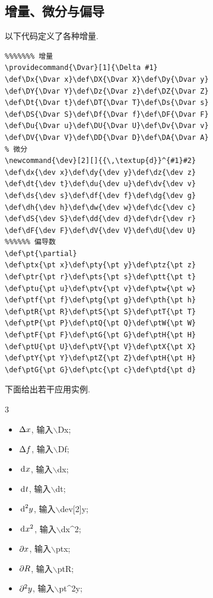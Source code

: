 \documentclass[a4paper,12pt,twoside]{ctexart}
\begin{document}
\subsection{增量、微分与偏导}
以下代码定义了各种增量.\vspace*{-10pt}
\begin{verbatim}
%%%%%%% 增量
\providecommand{\Dvar}[1]{\Delta #1}
\def\Dx{\Dvar x}\def\DX{\Dvar X}\def\Dy{\Dvar y}
\def\DY{\Dvar Y}\def\Dz{\Dvar z}\def\DZ{\Dvar Z}
\def\Dt{\Dvar t}\def\DT{\Dvar T}\def\Ds{\Dvar s}
\def\DS{\Dvar S}\def\Df{\Dvar f}\def\DF{\Dvar F}
\def\Du{\Dvar u}\def\DU{\Dvar U}\def\Dv{\Dvar v}
\def\DV{\Dvar V}\def\DD{\Dvar D}\def\DA{\Dvar A}
% 微分
\newcommand{\dev}[2][]{{\,\textup{d}}^{#1}#2}
\def\dx{\dev x}\def\dy{\dev y}\def\dz{\dev z}
\def\dt{\dev t}\def\du{\dev u}\def\dv{\dev v}
\def\ds{\dev s}\def\df{\dev f}\def\dg{\dev g}
\def\dh{\dev h}\def\dw{\dev w}\def\dc{\dev c}
\def\dS{\dev S}\def\dd{\dev d}\def\dr{\dev r}
\def\dF{\dev F}\def\dV{\dev V}\def\dU{\dev U}
%%%%%% 偏导数
\def\pt{\partial}
\def\ptx{\pt x}\def\pty{\pt y}\def\ptz{\pt z}
\def\ptr{\pt r}\def\pts{\pt s}\def\ptt{\pt t}
\def\ptu{\pt u}\def\ptv{\pt v}\def\ptw{\pt w}
\def\ptf{\pt f}\def\ptg{\pt g}\def\pth{\pt h}
\def\ptR{\pt R}\def\ptS{\pt S}\def\ptT{\pt T}
\def\ptP{\pt P}\def\ptQ{\pt Q}\def\ptW{\pt W}
\def\ptF{\pt F}\def\ptG{\pt G}\def\ptH{\pt H}
\def\ptU{\pt U}\def\ptV{\pt V}\def\ptX{\pt X}
\def\ptY{\pt Y}\def\ptZ{\pt Z}\def\ptH{\pt H}
\def\ptG{\pt G}\def\ptc{\pt c}\def\ptd{\pt d}
\end{verbatim}\vspace{-0pt}


下面给出若干应用实例.\vspace{-10pt}
\begin{multicols}{3}
\begin{itemize}
\item $\Dx$, 输入$\backslash$Dx;
\item $\Df$, 输入$\backslash$Df;
\item $\dx$, 输入$\backslash$dx;
\item $\dt$, 输入$\backslash$dt;
\item $\dev[2]y$, 输入$\backslash$dev[2]y;
\item $\dx^2$, 输入$\backslash$dx\^{}2;
\item $\ptx$, 输入$\backslash$ptx;
\item $\ptR$, 输入$\backslash$ptR;
\item $\pt^2y$, 输入$\backslash$pt\^{}2y;
\end{itemize}
\end{multicols}
\end{document}
